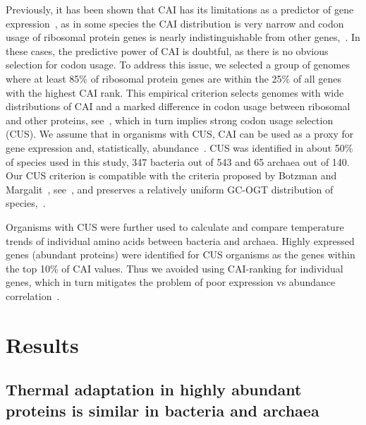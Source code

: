 \documentclass[10pt,letterpaper]{article}
\begin{document}
Previously, it has been shown that CAI has its limitations as a predictor of gene expression~\cite{Botzman2011Variation}, as in some species the CAI distribution is very narrow and codon usage of ribosomal protein genes is nearly indistinguishable from other genes,~. In these cases, the predictive power of CAI is doubtful, as there is no obvious selection for codon usage. To address this issue, we selected a group of genomes where at least 85\% of ribosomal protein genes are within the 25\% of all genes with the highest CAI rank. This empirical criterion selects genomes with wide distributions of CAI and a marked difference in codon usage between ribosomal and other proteins, see~, which in turn implies strong codon usage selection (CUS). We assume that in organisms with CUS, CAI can be used as a proxy for gene expression and, statistically, abundance~\cite{Sharp1987The,Jansen2003Revisiting,Supek2005Comparison,Maier2009Correlation}. CUS was identified in about 50\% of species used in this study, 347 bacteria out of 543 and 65 archaea out of 140. Our CUS criterion is compatible with the criteria proposed by Botzman and Margalit~\cite{Botzman2011Variation}, see~, and preserves a relatively uniform GC-OGT distribution of species,~.

Organisms with CUS were further used to calculate and compare temperature trends of individual amino acids between bacteria and archaea. Highly expressed genes (abundant proteins) were identified for CUS organisms as the genes within the top 10\% of CAI values. Thus we avoided using CAI-ranking for individual genes, which in turn mitigates the problem of poor expression vs abundance correlation~\cite{Maier2009Correlation}.


\section*{Results}

\subsection*{Thermal adaptation in highly abundant proteins is similar in bacteria and archaea}
\end{document}
